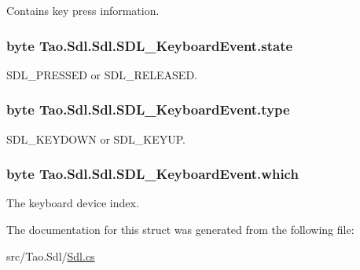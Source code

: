 Contains key press information. 

\hypertarget{struct_tao_1_1_sdl_1_1_sdl_1_1_s_d_l___keyboard_event_a3d1da595fe959e927580c85b5e710b63}{
\subsubsection[{state}]{\setlength{\rightskip}{0pt plus 5cm}byte {\bf Tao.Sdl.Sdl.SDL\_\-KeyboardEvent.state}}}
\label{struct_tao_1_1_sdl_1_1_sdl_1_1_s_d_l___keyboard_event_a3d1da595fe959e927580c85b5e710b63}


SDL\_\-PRESSED or SDL\_\-RELEASED. 

\hypertarget{struct_tao_1_1_sdl_1_1_sdl_1_1_s_d_l___keyboard_event_ad75c476fd7d0b3a6100e58cb3538984c}{
\subsubsection[{type}]{\setlength{\rightskip}{0pt plus 5cm}byte {\bf Tao.Sdl.Sdl.SDL\_\-KeyboardEvent.type}}}
\label{struct_tao_1_1_sdl_1_1_sdl_1_1_s_d_l___keyboard_event_ad75c476fd7d0b3a6100e58cb3538984c}


SDL\_\-KEYDOWN or SDL\_\-KEYUP. 

\hypertarget{struct_tao_1_1_sdl_1_1_sdl_1_1_s_d_l___keyboard_event_aee0d1eb02947a6037bb20d049d5893c6}{
\subsubsection[{which}]{\setlength{\rightskip}{0pt plus 5cm}byte {\bf Tao.Sdl.Sdl.SDL\_\-KeyboardEvent.which}}}
\label{struct_tao_1_1_sdl_1_1_sdl_1_1_s_d_l___keyboard_event_aee0d1eb02947a6037bb20d049d5893c6}


The keyboard device index. 



The documentation for this struct was generated from the following file:\begin{DoxyCompactItemize}
\item 
src/Tao.Sdl/\hyperlink{_sdl_8cs}{Sdl.cs}\end{DoxyCompactItemize}

